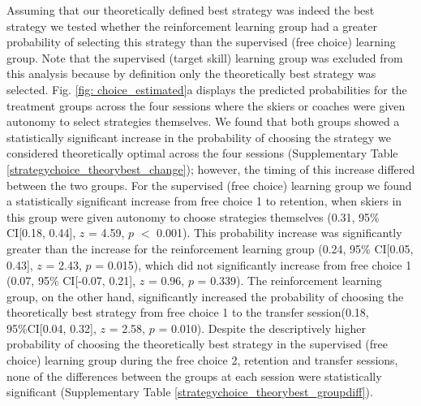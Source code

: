 \documentclass[pdflatex,sn-mathphys-num]{sn-jnl}%
\theoremstyle{thmstyleone}%
\theoremstyle{thmstyletwo}%
\theoremstyle{thmstylethree}%
\begin{document}
Assuming that our theoretically defined best strategy was indeed the best strategy we tested whether the reinforcement learning group had a greater probability of selecting this strategy than the supervised (free choice) learning group. Note that the supervised (target skill) learning group was excluded from this analysis because by definition only the theoretically best strategy was selected. Fig. \ref{fig: choice_estimated}a displays the predicted probabilities for the treatment groups across the four sessions where the skiers or coaches were given autonomy to select strategies themselves. We found that both groups showed a statistically significant increase in the probability of choosing the strategy we considered theoretically optimal across the four sessions (Supplementary Table \ref{strategychoice_theorybest_change}); however, the timing of this increase differed between the two groups. For the supervised (free choice) learning group we found a statistically significant increase from free choice 1 to retention, when skiers in this group were given autonomy to choose strategies themselves (0.31, 95\% CI[0.18, 0.44], $z$ = 4.59, $p$ $<$ 0.001). This probability increase was significantly greater than the increase for the reinforcement learning group (0.24, 95\% CI[0.05, 0.43], $z$ = 2.43, $p$ = 0.015), which did not significantly increase from free choice 1 (0.07, 95\% CI[-0.07, 0.21], $z$ = 0.96, $p$ = 0.339). The reinforcement learning group, on the other hand, significantly increased the probability of choosing the theoretically best strategy from free choice 1  to the transfer session(0.18, 95\%CI[0.04, 0.32], $z$ = 2.58, $p$ = 0.010). Despite the descriptively higher probability of choosing the theoretically best strategy in the supervised (free choice) learning group during the free choice 2, retention and transfer sessions, none of the differences between the groups at each session were statistically significant (Supplementary Table \ref{strategychoice_theorybest_groupdiff}). 
\end{document}
